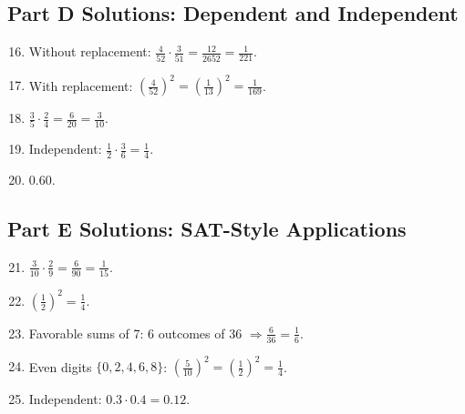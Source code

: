 \documentclass[14pt]{extarticle}
\begin{document}
\subsection*{Part D Solutions: Dependent and Independent}
\begin{enumerate}
  \setcounter{enumi}{15}
  \item Without replacement: \(\tfrac{4}{52}\cdot\tfrac{3}{51}=\tfrac{12}{2652}=\boxed{\tfrac{1}{221}}\).
  \item With replacement: \((\tfrac{4}{52})^2=(\tfrac{1}{13})^2=\tfrac{1}{169}\).
  \item \(\tfrac{3}{5}\cdot\tfrac{2}{4}=\tfrac{6}{20}=\tfrac{3}{10}\).
  \item Independent: \(\tfrac{1}{2}\cdot\tfrac{3}{6}=\tfrac{1}{4}\).
  \item \(0.60\).
\end{enumerate}

\subsection*{Part E Solutions: SAT-Style Applications}
\begin{enumerate}
  \setcounter{enumi}{20}
  \item \(\tfrac{3}{10}\cdot\tfrac{2}{9}=\tfrac{6}{90}=\tfrac{1}{15}\).
  \item \((\tfrac{1}{2})^2=\tfrac{1}{4}\).
  \item Favorable sums of 7: 6 outcomes of 36 \(\Rightarrow \tfrac{6}{36}=\tfrac{1}{6}\).
  \item Even digits \(\{0,2,4,6,8\}\): \((\tfrac{5}{10})^2=(\tfrac{1}{2})^2=\tfrac{1}{4}\).
  \item Independent: \(0.3\cdot0.4=0.12\).
\end{enumerate}




\end{document}
